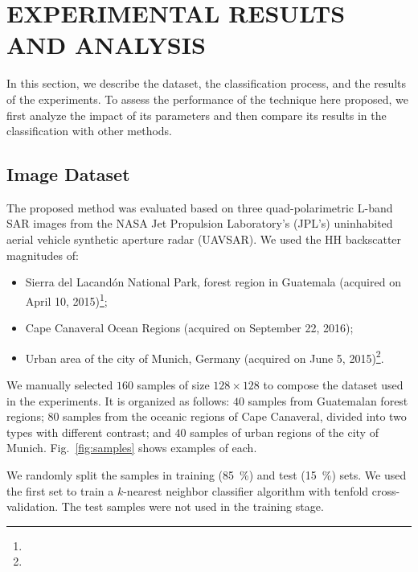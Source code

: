 \documentclass[journal]{IEEEtran}
\begin{document}
\section{EXPERIMENTAL RESULTS AND ANALYSIS}\label{Results}

In this section, we describe the dataset, 
the classification process, and 
the results of the experiments.
To assess the performance of the technique here proposed, we first analyze the impact of its parameters and then compare its results in the classification with other methods.

\subsection{Image Dataset}

The proposed method was evaluated based on three quad-polarimetric L-band SAR images from the NASA Jet Propulsion Laboratory’s (JPL’s) uninhabited aerial vehicle synthetic aperture radar (UAVSAR).
We used the HH backscatter magnitudes of:
\begin{itemize}
	\item Sierra del Lacandón National Park, forest region in Guatemala (acquired on April 10, 2015)\footnote{};
	\item Cape Canaveral Ocean Regions (acquired on September 22, 2016);
	\item Urban area of the city of Munich, Germany (acquired on June 5, 2015)\footnote{}.
\end{itemize}

We manually selected $160$ samples of size $128 \times 128$ to compose the dataset used in the experiments.
It is organized as follows:
$40$ samples from Guatemalan forest regions;
$80$ samples from the oceanic regions of Cape Canaveral, divided into two types with different contrast; and
$40$ samples of urban regions of the city of Munich.
Fig.~\ref{fig:samples} shows examples of each.


We randomly split the samples in training (\SI{85}{\percent}) and test (\SI{15}{\percent}) sets.
We used the first set to train a $k$-nearest neighbor classifier algorithm with tenfold cross-validation.
The test samples were not used in the training stage.
\end{document}
